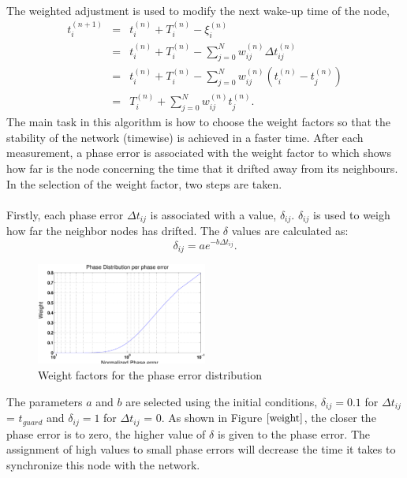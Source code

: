 \documentclass[a4paper,10pt]{report}
\begin{document}
\paragraph*{}
The weighted adjustment is used to modify the next wake-up time of the node,
\begin{eqnarray*}
t_i^{(n+1)} &=& t_i^{(n)} + T_i^{(n)} - \xi_i^{(n)} \\ &=& t_i^{(n)}
+ T_i^{(n)} - \sum_{j=0}^N{w_{ij}^{(n)}\Delta t_{ij}^{(n)}} \\ &=&
t_i^{(n)}+ T_i^{(n)} -
\sum_{j=0}^N{w_{ij}^{(n)}(t_i^{(n)}-t_j^{(n)})} \\ &=& T_i^{(n)} + \sum_{j=0}^N{w_{ij}^{(n)}t_j^{(n)}}.
\end{eqnarray*}
The main task in this algorithm is how to choose the weight factors so that the stability of the network (timewise) is achieved in a faster time. After each measurement, a phase error is associated with the weight  factor to which shows how far is the node concerning the time that it drifted away from its neighbours. In the selection of the weight factor, two steps are taken. \paragraph*{} \noindent 
Firstly, each phase error $\Delta t_{ij}$ is associated with a value, $\delta_{ij}$. $\delta_{ij}$ is used to weigh how far the neighbor nodes has drifted. The $\delta$ values are calculated as:
\begin{equation}
\delta_{ij} = ae^{-b\Delta t_{ij}}.
\end{equation}
\begin{figure}[t]
\centering
\includegraphics[width= 0.5\textwidth]{weight}
\caption{Weight factors for the phase error distribution}
\label{weight}
\end{figure}
The parameters $a$ and $b$ are selected using the initial conditions, $\delta_{ij}=0.1$ for $\Delta t_{ij}$ = $t_{guard}$ and $\delta_{ij}=1$ for $\Delta t_{ij}$ = 0. As shown in Figure $\ref{weight}$, the closer the phase error is to zero, the higher value of $\delta$ is given to the phase error. The assignment of high values to small phase errors will decrease the time it takes to synchronize  this node with the network.
\end{document}
